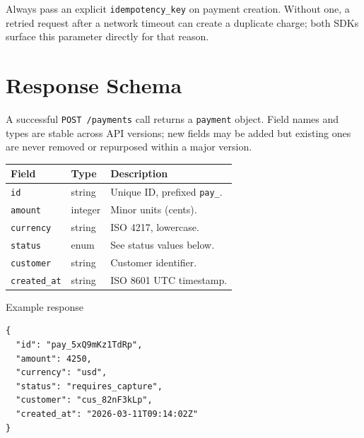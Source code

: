 \documentclass[10pt]{article}
\begin{document}
\vspace{1mm}
\begin{warnbox}
Always pass an explicit \texttt{idempotency\_key} on payment creation. Without one, a
retried request after a network timeout can create a duplicate charge; both SDKs surface
this parameter directly for that reason.
\end{warnbox}

\section{Response Schema}

A successful \texttt{POST /payments} call returns a \texttt{payment} object. Field names
and types are stable across API versions; new fields may be added but existing ones are
never removed or repurposed within a major version.

\begin{minipage}[t]{0.56\textwidth}
\renewcommand{\arraystretch}{1.15}
\begin{tabularx}{\textwidth}{@{}l l X@{}}
\toprule
\textbf{Field} & \textbf{Type} & \textbf{Description} \\
\midrule
\texttt{id} & string & Unique ID, prefixed \texttt{pay\_}. \\
\texttt{amount} & integer & Minor units (cents). \\
\texttt{currency} & string & ISO 4217, lowercase. \\
\texttt{status} & enum & See status values below. \\
\texttt{customer} & string & Customer identifier. \\
\texttt{created\_at} & string & ISO 8601 UTC timestamp. \\
\bottomrule
\end{tabularx}
\end{minipage}\hfill
\begin{minipage}[t]{0.42\textwidth}
\begin{codepanel}{Example response}
\begin{lstlisting}[style=nexajson]
{
  "id": "pay_5xQ9mKz1TdRp",
  "amount": 4250,
  "currency": "usd",
  "status": "requires_capture",
  "customer": "cus_82nF3kLp",
  "created_at": "2026-03-11T09:14:02Z"
}
\end{lstlisting}
\end{codepanel}
\end{minipage}
\par
\end{document}
